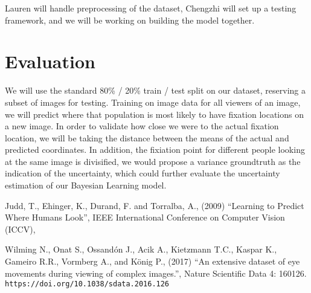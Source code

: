 \documentclass[11pt]{article}
\begin{document}
Lauren will handle preprocessing of the dataset, Chengzhi will set up a testing
framework, and we will be working on building the model together. 
\vspace{-0.5cm}

\section{Evaluation}
We will use the standard 80\% / 20\% train / test split on our dataset,
reserving a subset of images for testing. Training on image data for all viewers of
an image, we will predict where that population is most likely to have fixation
locations on a new image. In order to validate how close we were to the actual
fixation location, we will be taking the distance between the means of the
actual and predicted coordinates. In addition, the fixiation point for different 
people looking at the same image is divisified, we would propose a variance groundtruth
as the indication of the uncertainty, which could further evaluate the uncertainty estimation
of our Bayesian Learning model.



\vspace{-0.25cm}


\begin{thebibliography}{99}
      Judd, T., Ehinger, K., Durand, F. and Torralba, A.,
      (2009)
      ``Learning to Predict Where Humans Look'',
      IEEE International Conference on Computer Vision (ICCV),

     Wilming N., Onat S., Ossandón J., Acik A., Kietzmann
    T.C., Kaspar K., Gameiro R.R., Vormberg A., and König P., (2017)
    ``An extensive dataset of eye movements during viewing of complex
    images.'', Nature Scientific Data 4: 160126.  \verb|https://doi.org/10.1038/sdata.2016.126|

\end{thebibliography}
\end{document}
